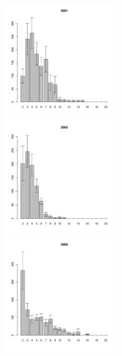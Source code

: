 	\begin{figure}[hp]

	\begin{minipage}[b]{.3\linewidth}
	\begin{center}
	\includegraphics[width=60mm]{../White_Sea/Ryashkov_YuG/YuG2_2001_.pdf}
	\end{center}
	\end{minipage}
	\hfill
	\begin{minipage}[b]{.3\linewidth}
	\begin{center}
	\includegraphics[width=60mm]{../White_Sea/Ryashkov_YuG/YuG2_2005_.pdf}
	\end{center}
	\end{minipage}
	\hfill
	\begin{minipage}[b]{.3\linewidth}
	\begin{center}
	\includegraphics[width=60mm]{../White_Sea/Ryashkov_YuG/YuG2_2009_.pdf}

\end{center}
\end{minipage}
\end{figure}
